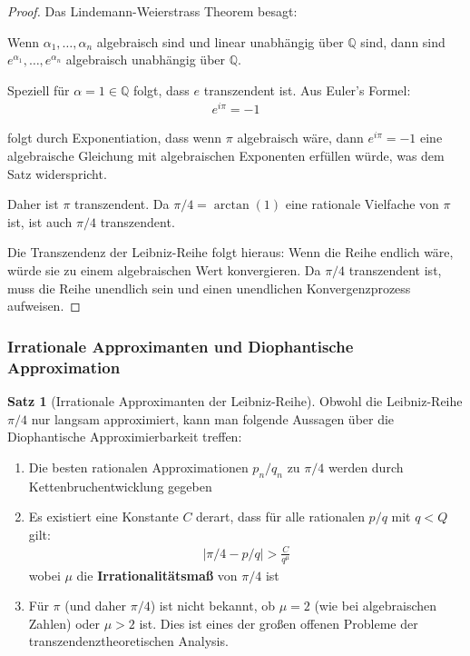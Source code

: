 \documentclass[a4paper,12pt,twoside]{report}
\theoremstyle{definition}
\newtheorem{satz}{Satz}
\begin{document}
\begin{proof}
Das Lindemann-Weierstrass Theorem besagt:

Wenn $\alpha_1, \ldots, \alpha_n$ algebraisch sind und linear unabhängig über $\mathbb{Q}$ sind, dann sind $e^{\alpha_1}, \ldots, e^{\alpha_n}$ algebraisch unabhängig über $\mathbb{Q}$.

Speziell für $\alpha = 1 \in \mathbb{Q}$ folgt, dass $e$ transzendent ist. Aus Euler's Formel:
\begin{align}
	e^{i\pi} = -1
\end{align}

folgt durch Exponentiation, dass wenn $\pi$ algebraisch wäre, dann $e^{i\pi} = -1$ eine algebraische Gleichung mit algebraischen Exponenten erfüllen würde, was dem Satz widerspricht.

Daher ist $\pi$ transzendent. Da $\pi/4 = \arctan(1)$ eine rationale Vielfache von $\pi$ ist, ist auch $\pi/4$ transzendent.

Die Transzendenz der Leibniz-Reihe folgt hieraus: Wenn die Reihe endlich wäre, würde sie zu einem algebraischen Wert konvergieren. Da $\pi/4$ transzendent ist, muss die Reihe unendlich sein und einen unendlichen Konvergenzprozess aufweisen.
\end{proof}

\subsubsection{Irrationale Approximanten und Diophantische Approximation}

\begin{satz}[Irrationale Approximanten der Leibniz-Reihe]
Obwohl die Leibniz-Reihe $\pi/4$ nur langsam approximiert, kann man folgende Aussagen über die Diophantische Approximierbarkeit treffen:

\begin{enumerate}
	\item Die besten rationalen Approximationen $p_n/q_n$ zu $\pi/4$ werden durch Kettenbruchentwicklung gegeben
	
	\item Es existiert eine Konstante $C$ derart, dass für alle rationalen $p/q$ mit $q < Q$ gilt:
	\begin{align}
		\left| \pi/4 - p/q \right| > \frac{C}{q^{\mu}}
	\end{align}
	wobei $\mu$ die \textbf{Irrationalitätsmaß} von $\pi/4$ ist
	
	\item Für $\pi$ (und daher $\pi/4$) ist nicht bekannt, ob $\mu = 2$ (wie bei algebraischen Zahlen) oder $\mu > 2$ ist. Dies ist eines der großen offenen Probleme der transzendenztheoretischen Analysis.
\end{enumerate}
\end{satz}
\end{document}
